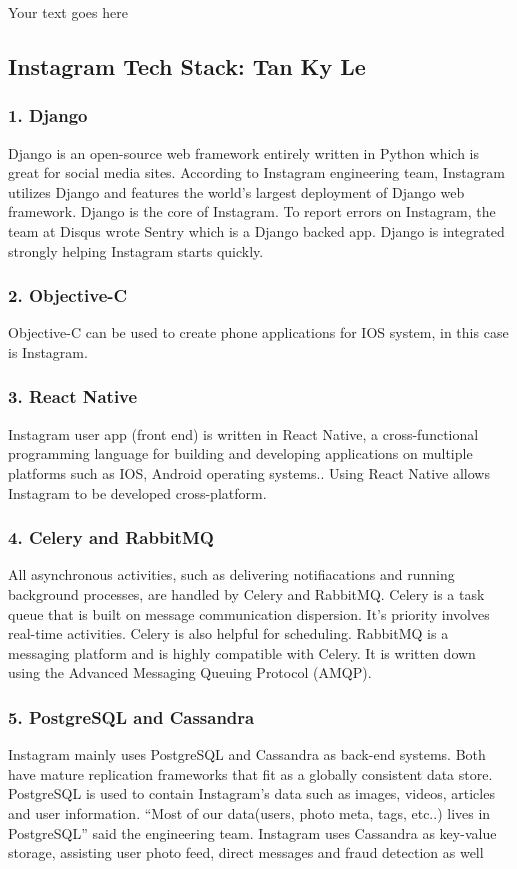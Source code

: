 \documentclass[a4paper, 11pt]{report}
\begin{document}
Your text goes here

\subsection{ Instagram Tech Stack: Tan Ky Le}
\subsubsection{1. Django}
 Django is an open-source web framework entirely written in Python which is great for social media sites. According to Instagram engineering team, Instagram utilizes Django and features the world’s largest deployment of Django web framework\cite{ky3}. Django is the core of Instagram. To report errors on Instagram, the team at Disqus wrote Sentry which is a Django backed app. Django is integrated strongly helping Instagram starts quickly\cite{ky4}. 
\subsubsection{2. Objective-C}
Objective-C can be used to create phone applications for IOS system, in this case is Instagram.
\subsubsection{3. React Native}
Instagram user app (front end) is written in React Native, a cross-functional programming language for building and developing applications on multiple platforms such as IOS, Android operating systems.\cite{ky7}. Using React Native allows Instagram to be developed cross-platform.
\subsubsection{4. Celery and RabbitMQ}
All asynchronous activities, such as delivering notifiacations and running background processes, are handled by Celery and RabbitMQ. Celery is a task queue that is built on message communication dispersion. It's priority involves real-time activities. Celery is also helpful for scheduling. RabbitMQ is a messaging platform and is highly compatible with Celery. It is written down using the Advanced Messaging Queuing Protocol (AMQP)\cite{ky4}.
\subsubsection{5. PostgreSQL and Cassandra}
Instagram mainly uses PostgreSQL and Cassandra as back-end systems. Both have mature replication frameworks that fit as a globally consistent data store\cite{ky5}. PostgreSQL is used to contain Instagram’s data such as images, videos, articles and user information\cite{ky4}. “Most of our data(users, photo meta, tags, etc..) lives in PostgreSQL” said the engineering team. Instagram uses Cassandra as key-value storage, assisting user photo feed, direct messages and fraud detection as well\cite{ky6}
\end{document}
